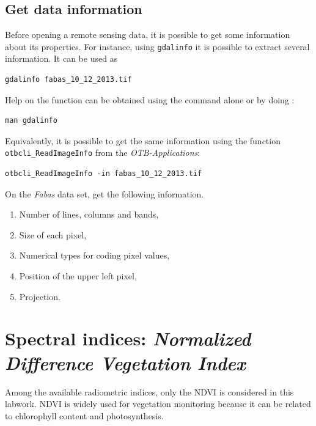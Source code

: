 \documentclass[a4paper,11pt,DIV=18]{scrartcl}
\begin{document}
\subsection{Get data information}
\label{sec:org8449e9e}
Before  opening a  remote sensing  data, it  is possible  to get  some
information about its  properties. For instance, using  \texttt{gdalinfo} it is
possible to extract several information.  It can be used as

\begin{verbatim}
gdalinfo fabas_10_12_2013.tif
\end{verbatim}

Help  on the function  can be obtained using  the command alone or by
doing :

\begin{verbatim}
man gdalinfo
\end{verbatim}

Equivalently, it is possible to get the same information using the
function \texttt{otbcli\_ReadImageInfo} from the \emph{OTB-Applications}:

\begin{verbatim}
otbcli_ReadImageInfo -in fabas_10_12_2013.tif
\end{verbatim}


\begin{work}
On the \emph{Fabas} data set, get the following information.
\begin{enumerate}
\item Number of lines, columns and bands,
\item Size of each pixel,
\item Numerical types for coding pixel values,
\item Position of the upper left pixel,
\item Projection.
\end{enumerate}
\end{work}
\section{Spectral indices: \emph{Normalized Difference Vegetation Index}}
\label{sec:orga1f4293}
Among the available  radiometric indices, only the  NDVI is considered
in this labwork. NDVI is widely used for vegetation monitoring because
it can be related to chlorophyll content and photosynthesis.
\end{document}
